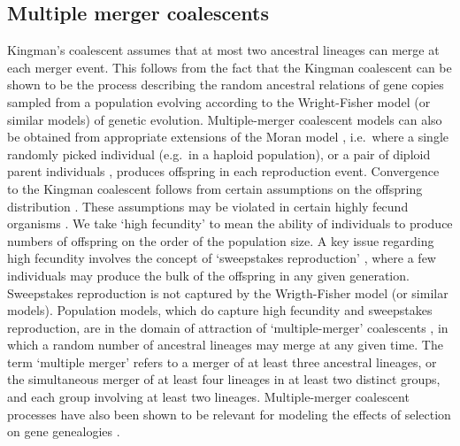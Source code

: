 \documentclass{article}
\begin{document}
%

\linenumbers

\subsection*{Multiple merger coalescents}%
\label{mmc}%


Kingman's coalescent assumes that at most two ancestral lineages can
merge at each merger event.  This follows from the fact that the
Kingman coalescent can be shown to be the process describing the
random ancestral relations of gene copies sampled from a population
evolving according to the Wright-Fisher model (or similar models) of
genetic evolution.  Multiple-merger coalescent models can also be
obtained from appropriate extensions of the Moran
model \citep{EW06,HM12}, i.e.\ where a single randomly picked individual
(e.g.\ in a haploid population), or a pair of diploid parent
individuals \citep{BBE13}, produces offspring in each reproduction
event.  Convergence to the Kingman coalescent follows from certain
assumptions on the offspring distribution \citep{S99,MS01,SW08}.  These
assumptions may be violated in certain highly fecund
organisms \citep{hedgecock_94,B94,HP11,A04,irwin16}.  We take `high
fecundity' to mean the ability of individuals to produce numbers of
offspring on the order of the population size.  A key issue regarding
high fecundity involves the concept of `sweepstakes
reproduction' \citep{hedgecock_94}, where a few individuals may produce
the bulk of the offspring in any given generation.  Sweepstakes
reproduction is not captured by the Wrigth-Fisher model (or similar
models).  Population models, which do capture high fecundity and
sweepstakes reproduction, are in the domain of attraction of
`multiple-merger' coalescents \citep{DK99,P99,S99,S00}, in which a
random number of ancestral lineages may merge at any given time.  The
term `multiple merger' refers to a merger of at least three ancestral
lineages, or the simultaneous \citep{S00,MS01} merger of at least four
lineages in at least two distinct groups, and each group involving at
least two lineages.  Multiple-merger coalescent processes have also
been shown to be relevant for modeling the effects of selection on
gene genealogies \citep{Gillespie909,DS04}. 
\end{document}
